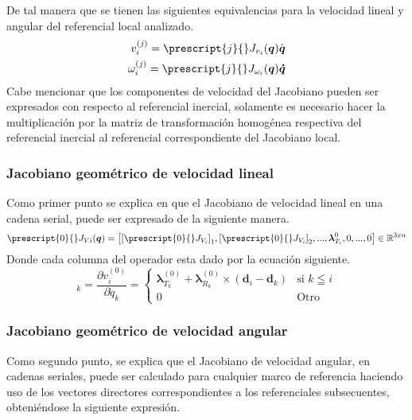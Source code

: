         De tal manera que se tienen las siguientes equivalencias para la velocidad lineal y angular del 
        referencial local analizado.
        \begin{align*}
            v^{(j)}_i = \prescript{j}{}J_{v_i}(\boldsymbol{q})\dot{\boldsymbol{q}} \\
            \omega^{(j)}_i = \prescript{j}{}J_{\omega_i}(\boldsymbol{q})\boldsymbol{\dot{q}}
        \end{align*}
        Cabe mencionar que los componentes de velocidad del Jacobiano pueden ser expresados 
        con respecto al referencial inercial, solamente es necesario hacer la multiplicación 
        por la matriz de transformación homogénea respectiva del referencial inercial al referencial 
        correspondiente del Jacobiano local.

    \subsubsection{Jacobiano geométrico de velocidad lineal}
        Como primer punto se explica en \cite{3DMotion} que el Jacobiano de velocidad lineal 
        en una cadena serial, puede ser expresado de la siguiente manera.
        \begin{equation}
            \prescript{0}{}J_{Vi}(\boldsymbol{q}) = 
            \left[{[\prescript{0}{}J_{V_i}]}_1, {[\prescript{0}{}J_{V_i}]}_2, ..., \boldsymbol{\lambda}^{0}_{T_i}, 0, ..., 0\right]
            \in \mathbb{R}^{3xn}
            \label{eq:Jv}
        \end{equation}
        Donde cada columna del operador esta dado por la ecuación siguiente.
        \begin{equation*}
            [\prescript{0}{}J_{Vi}]_k = \frac{\partial v^{(0)}_i}{\partial \dot{q}_k} = 
            \begin{cases}
                \boldsymbol{\lambda}^{(0)}_{T_k} + \boldsymbol{\lambda}^{(0)}_{R_k} \times (\boldsymbol{d}_i - \boldsymbol{d}_k) & \text{si } k \leqq i \\
                0                                                          & \text{Otro}
            \end{cases}
        \end{equation*}
    \subsubsection{Jacobiano geométrico de velocidad angular}
        Como segundo punto, se explica que el Jacobiano de velocidad angular, 
        en cadenas seriales, puede ser calculado para cualquier marco de referencia 
        haciendo uso de los vectores directores correspondientes a los referenciales 
        subsecuentes, obteniéndose la siguiente expresión.

